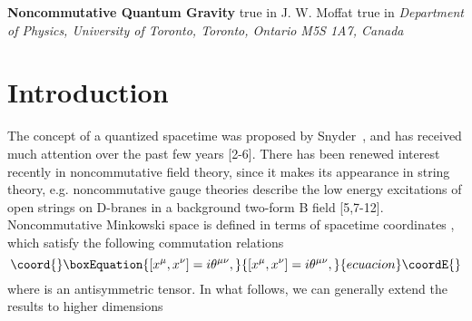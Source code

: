 \documentclass[a4paper,10pt]{article}
\begin{document}
\pagestyle{plain}
\setcounter{page}{1}
\begin{center}
{\large\bf Noncommutative Quantum Gravity}
 true in
{\large J. W. Moffat}
 true in
{\it Department of Physics, University of Toronto,
Toronto, Ontario M5S 1A7, Canada}
\end{center}
\begin{abstract}%
The possible role of gravity in a noncommutative geometry is investigated.
Due to the Moyal *-product of fields in noncommutative geometry, it is
necessary to complexify the metric tensor of gravity. We first consider
the possibility of a complex Hermitian, nonsymmetric \coordHE{} and
discuss the problems associated with such a theory. We then introduce a
complex symmetric (non-Hermitian) metric, with the associated
complex connection and curvature, as the basis of a noncommutative
spacetime geometry. The spacetime coordinates are in general complex and
the group of local gauge transformations is associated with the complex
group of Lorentz transformations \coordHE{}. A real action is chosen to
obtain a consistent set of field equations. A Weyl quantization of the
metric associated with the algebra of noncommuting coordinates is employed.
\end{abstract}



\section{Introduction}

The concept of a quantized spacetime was proposed by Snyder~\cite{Snyder}, and has
received much attention over the past few
years [2-6]. There has been renewed interest
recently in noncommutative field theory, since it makes its appearance
in string theory, e.g. noncommutative gauge theories describe the low
energy excitations of open strings on D-branes in a background two-form B
field [5,7-12]. Noncommutative Minkowski space is defined in
terms of spacetime coordinates \coordHE{}, which satisfy
the following commutation relations
\begin{equation}\coord{}\boxEquation{
[x^\mu,x^\nu]=i\theta^{\mu\nu},
}{
[x^\mu,x^\nu]=i\theta^{\mu\nu},
}{ecuacion}\coordE{}\end{equation}
where \myHighlight{$\theta^{\mu\nu}$}\coordHE{} is an antisymmetric tensor. In what
follows, we can generally extend the results to higher dimensions
\coordHE{}
\end{document}

